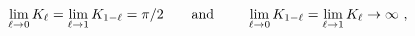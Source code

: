 \begin{equation}
\lim_{\ell \rightarrow 0}K_{\ell }=\lim_{\ell \rightarrow 1}K_{1-\ell }=\pi
/2\qquad \text{and\qquad\ }\lim_{\ell \rightarrow 0}K_{1-\ell }=\lim_{\ell
\rightarrow 1}K_{\ell }\rightarrow \infty ~,  \label{kk}
\end{equation}%
